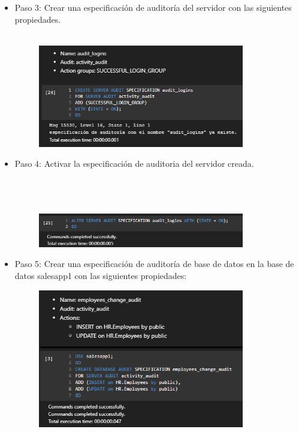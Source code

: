 \begin{itemize}
	\item Paso 3: Crear una especificación de auditoría del servidor con las siguientes propiedades. \\\\
	\begin{figure}[htb]
	\begin{center}
	\includegraphics[width=9cm]{./Imagenes/audit4}
	\end{center}
	\end{figure}
	
	\item Paso 4: Activar la especificación de auditoria del servidor creada.\\\\\\\\
	\begin{figure}[htb]
	\begin{center}
	\includegraphics[width=9cm]{./Imagenes/audit5}
	\end{center}
	\end{figure}

	\item Paso 5:  Crear una especificación de auditoría de base de datos en la base de datos salesapp1 con las siguientes propiedades:
	\begin{figure}[htb]
	\begin{center}
	\includegraphics[width=9cm]{./Imagenes/audit6}
	\end{center}
	\end{figure}


\end{itemize}
